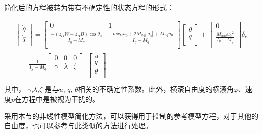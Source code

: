 简化后的方程被转为带有不确定性的状态方程的形式：

\begin{equation}
\begin{array}{l}
 \left[ {\begin{array}{*{20}{c}}
   {\dot \theta }  \\
   {\dot q}  \\
\end{array}} \right] = \left[ {\begin{array}{*{20}{c}}
   0 & 1  \\
   {\frac{{ - ({z_G}W - {z_B}B)\cos {\theta _0}}}{{{I_y} - {M_{\dot q}}}}} & {\frac{{ - m{x_G}u_0^{} + 2{M_{q\left| q \right|}}\left| {{q_0}} \right| + {M_{uq}}{u_0}}}{{{I_y} - {M_{\dot q}}}}}  \\
\end{array}} \right]\left[ {\begin{array}{*{20}{c}}
   \theta   \\
   q  \\
\end{array}} \right] + \left[ {\begin{array}{*{20}{c}}
   0  \\
   {\frac{{{M_{uu\delta }}{u_0}^2}}{{{I_y} - {M_{\dot q}}}}}  \\
\end{array}} \right]{\delta _e} \\
 \begin{array}{*{20}{c}}
   {} & { + \frac{1}{{{I_y} - {M_{\dot q}}}}\left[ {\begin{array}{*{20}{c}}
   0 & 0 & 0  \\
   \gamma  & \lambda  & \zeta   \\
\end{array}} \right]}  \\
\end{array}\left[ {\begin{array}{*{20}{c}}
   u  \\
   q  \\
   \theta   \\
\end{array}} \right] \\
 \end{array}
\end{equation}
其中， $\gamma$,$\lambda$,$\zeta$ 是与$u$, $q$, $\theta$相关的不确定性系数。此外，横滚自由度的横滚角$\varphi$、速度$p$在方程中是被视为干扰的。

采用本节的非线性模型简化方法，可以获得用于控制的参考模型方程，对于其他的自由度，也可以参考与此类似的方法进行处理。

